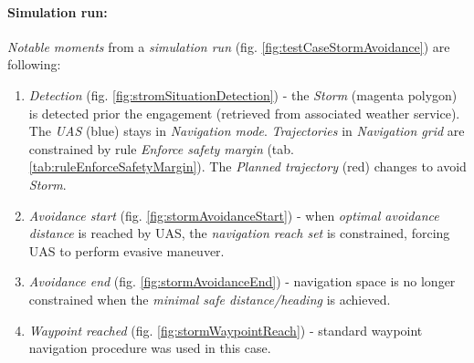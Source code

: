    \paragraph{Simulation run:} \emph{Notable moments} from a \emph{simulation run} (fig. \ref{fig:testCaseStormAvoidance}) are following:
    \begin{enumerate}
    
        \item \emph{Detection} (fig. \ref{fig:stromSituationDetection}) - the \emph{Storm} (magenta polygon) is detected prior the engagement (retrieved from associated weather service). The \emph{UAS} (blue) stays in \emph{Navigation mode}. \emph{Trajectories} in \emph{Navigation grid} are constrained by rule \emph{Enforce safety margin} (tab. \ref{tab:ruleEnforceSafetyMargin}). The \emph{Planned trajectory} (red) changes to avoid \emph{Storm}.
        
        \item \emph{Avoidance start} (fig. \ref{fig:stormAvoidanceStart}) - when \emph{optimal avoidance distance} is reached by UAS, the \emph{navigation reach set} is constrained, forcing UAS to perform evasive maneuver.
        
        \item \emph{Avoidance end} (fig. \ref{fig:stormAvoidanceEnd}) - navigation space is no longer constrained when the \emph{minimal safe distance/heading} is achieved.
        
        \item \emph{Waypoint reached} (fig. \ref{fig:stormWaypointReach}) - standard waypoint navigation procedure was used in this case.
        
    \end{enumerate}
        
